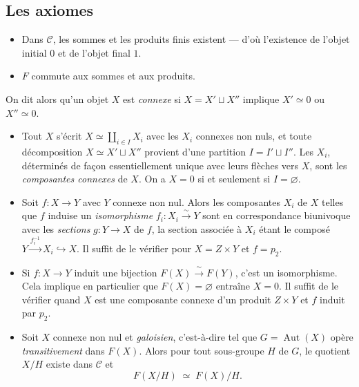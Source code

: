 \documentclass[11pt,a4paper]{article}
\begin{document}
\subsection*{Les axiomes}

\begin{itemize}
  \item[\textbf{Gal 1}] Dans $\mathcal{C}$, les sommes et les produits finis
    existent --- d'où l'existence de l'objet initial $0$ et de l'objet final
    $1$.

  \item[\textbf{Gal 4}] $F$ commute aux sommes et aux produits.
\end{itemize}

On dit alors qu'un objet $X$ est \emph{connexe} si $X = X' \sqcup X''$ implique
$X' \simeq 0$ ou $X'' \simeq 0$.

\begin{itemize}
  \item[\textbf{Gal 2}] Tout $X$ s'écrit $X \simeq \coprod_{i \in I} X_{i}$
    avec les $X_{i}$ connexes non nuls, et toute décomposition
    $X \simeq X' \sqcup X''$ provient d'une partition $I = I' \sqcup I''$. Les
    $X_{i}$, déterminés de façon essentiellement unique avec leurs flèches vers
    $X$, sont les \emph{composantes connexes} de $X$. On a $X = 0$ si et
    seulement si $I = \varnothing$.

  \item[\textbf{Gal 3}] Soit $f : X \to Y$ avec $Y$ connexe non nul. Alors les
    composantes $X_{i}$ de $X$ telles que $f$ induise un \emph{isomorphisme}
    $f_{i} : X_{i} \xrightarrow{\ \sim\ } Y$ sont en correspondance
    biunivoque avec les \emph{sections} $g : Y \to X$ de $f$, la section
    associée à $X_{i}$ étant le composé
    $Y \xrightarrow{f_{i}^{-1}} X_{i} \hookrightarrow X$. Il suffit de le
    vérifier pour $X = Z \times Y$ et $f = p_{2}$.

  \item[\textbf{Gal 5}] Si $f : X \to Y$ induit une bijection
    $F(X) \xrightarrow{\ \sim\ } F(Y)$, c'est un isomorphisme. Cela implique en
    particulier que $F(X) = \varnothing$ entraîne $X = 0$. Il suffit de le
    vérifier quand $X$ est une composante connexe d'un produit $Z \times Y$ et
    $f$ induit par $p_{2}$.

  \item[\textbf{Gal 6}] Soit $X$ connexe non nul et \emph{galoisien},
    c'est-à-dire tel que $G = \operatorname{Aut}(X)$ opère
    \emph{transitivement} dans $F(X)$. Alors pour tout sous-groupe $H$ de $G$,
    le quotient $X/H$ existe dans $\mathcal{C}$ et
    \[
      F(X/H) \;\simeq\; F(X)/H .
    \]
\end{itemize}
\end{document}

